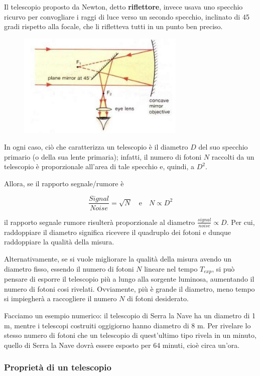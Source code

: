 Il telescopio proposto da Newton, detto \textbf{riflettore}, invece usava uno specchio ricurvo per convogliare i raggi di luce verso un secondo specchio, inclinato di 45 gradi rispetto alla focale, che li rifletteva tutti in un punto ben preciso.

\begin{figure}[H]
    \centering
    \includegraphics[width=8cm]{WhatsApp Image 2023-01-09 at 02.44.03.jpeg}
    \label{fig:my_label5}
\end{figure}

In ogni caso, ciò che caratterizza un telescopio è il diametro $D$ del suo specchio primario (o della sua lente primaria); infatti, il numero di fotoni $N$ raccolti da un telescopio è proporzionale all'area di tale specchio e, quindi, a $D^2$.

Allora, se il rapporto segnale/rumore è

$$\frac{Signal}{Noise}=\sqrt{N}
\quad\text{e}\quad
N \propto D^2$$

il rapporto segnale rumore risulterà proporzionale al diametro $\frac{signal}{noise} \propto D$. Per cui, raddoppiare il diametro significa ricevere il quadruplo dei fotoni e dunque raddoppiare la qualità della misura.

Alternativamente, se si vuole migliorare la qualità della misura avendo un diametro fisso, essendo il numero di fotoni $N$ lineare nel tempo $T_{exp}$, si può pensare di esporre il telescopio più a lungo alla sorgente luminosa, aumentando il numero di fotoni cosi rivelati. Ovviamente, più è grande il diametro, meno tempo si impiegherà a raccogliere il numero $N$ di fotoni desiderato.

Facciamo un esempio numerico: il telescopio di Serra la Nave ha un diametro di 1 m, mentre i telescopi costruiti oggigiorno hanno diametro di 8 m. Per rivelare lo stesso numero di fotoni che un telescopio di quest'ultimo tipo rivela in un minuto, quello di Serra la Nave dovrà essere esposto per 64 minuti, cioè circa un'ora.

\subsubsection{Proprietà di un telescopio}

